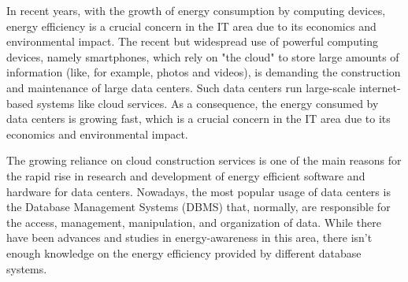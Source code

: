 %
\begin{comment}

The dissertation must contain two versions of the abstract, one in the same language as the main text, another in a different language.  The package assumes that the two languages under consideration are always Portuguese and English.

The package will sort the abstracts in the appropriate order. This means that the first abstract will be in the same language as the main text, followed by the abstract in the other language, and then followed by the main text. For example, if the dissertation is written in Portuguese, first will come the summary in Portuguese and then in English, followed by the main text in Portuguese. If the dissertation is written in English, first will come the summary in English and then in Portuguese, followed by the main text in English.

The abstract should not exceed one page and should answer the following questions:
*%
\begin{itemize}
	\item What's the problem?
	\item Why is it interesting?
	\item What's the solution?
	\item What follows from the solution?
\end{itemize}
\end{comment}


In recent years, with the growth of energy consumption by computing devices, energy efficiency is a crucial concern in the IT area due to its economics and environmental impact.  The recent but widespread use of powerful computing devices, namely smartphones, which rely on "the cloud" to store large amounts of information (like, for example, photos and videos), is demanding the construction and maintenance of large data centers. Such data centers run large-scale internet-based systems like cloud services. As a consequence, the energy consumed by data centers is growing fast, which is a crucial concern in the IT area due to its economics and environmental impact.  

The growing reliance on cloud construction services is one of the main reasons for the rapid rise in research and development of energy efficient software and hardware for data centers. Nowadays, the most popular usage of data centers is the Database Management Systems (DBMS) that, normally, are responsible for the access, management, manipulation, and organization of data. While there have been advances and studies in energy-awareness in this area, there isn't enough knowledge on the energy efficiency provided by different database systems.

